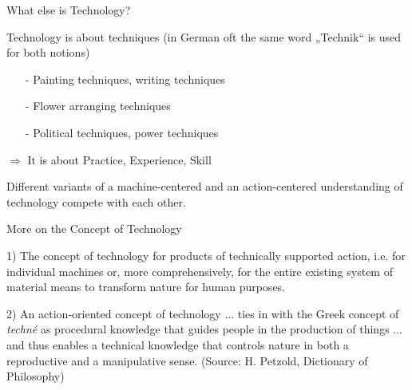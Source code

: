 \documentclass{beamer}
\begin{document}

\begin{frame}{What else is Technology?}

  Technology is about techniques (in German oft the same word „Technik“ is
  used for both notions)
  
  \begin{itemize}
  \item[-] Painting techniques, writing techniques
  \item[-] Flower arranging techniques
  \item[-] Political techniques, power techniques
  \end{itemize}

  \begin{center}\Large
    $\Rightarrow$ It is about Practice, Experience, Skill
  \end{center}
Different variants of a machine-centered and an action-centered understanding
of technology compete with each other.

\end{frame}

\begin{frame}{More on the Concept of Technology}

1) The concept of technology for products of technically supported action,
i.e. for individual machines or, more comprehensively, for the entire existing
system of material means to transform nature for human purposes.

2) An action-oriented concept of technology ... ties in with the Greek concept
of \emph{techné} as procedural knowledge that guides people in the production
of things ... and thus enables a technical knowledge that controls nature in
both a reproductive and a manipulative sense. (Source: H. Petzold, Dictionary
of Philosophy)

\end{frame}
\end{document}
